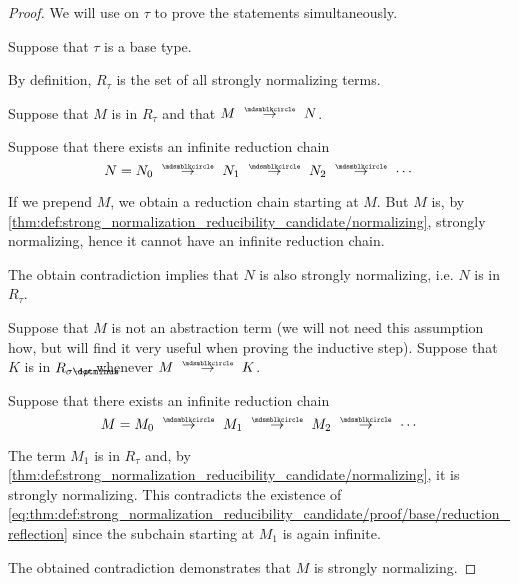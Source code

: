 \begin{proof}
  We will use  on \( \tau \) to prove the statements simultaneously.

   Suppose that \( \tau \) is a base type.

   By definition, \( R_\tau \) is the set of all strongly normalizing terms.

   Suppose that \( M \) is in \( R_\tau \) and that \( M \pred N \).

  Suppose that there exists an infinite reduction chain
  \begin{equation*}
    N = N_0 \pred N_1 \pred N_2 \pred \cdots
  \end{equation*}

  If we prepend \( M \), we obtain a reduction chain starting at \( M \). But \( M \) is, by \ref{thm:def:strong_normalization_reducibility_candidate/normalizing}, strongly normalizing, hence it cannot have an infinite reduction chain.

  The obtain contradiction implies that \( N \) is also strongly normalizing, i.e. \( N \) is in \( R_\tau \).

   Suppose that \( M \) is not an abstraction term (we will not need this assumption how, but will find it very useful when proving the inductive step). Suppose that \( K \) is in \( R_{\sigma \synimplies \rho} \) whenever \( M \pred K \).

  Suppose that there exists an infinite reduction chain
  \begin{equation}\label{eq:thm:def:strong_normalization_reducibility_candidate/proof/base/reduction_reflection}
    M = M_0 \pred M_1 \pred M_2 \pred \cdots
  \end{equation}

  The term \( M_1 \) is in \( R_\tau \) and, by \ref{thm:def:strong_normalization_reducibility_candidate/normalizing}, it is strongly normalizing. This contradicts the existence of \eqref{eq:thm:def:strong_normalization_reducibility_candidate/proof/base/reduction_reflection} since the subchain starting at \( M_1 \) is again infinite.

  The obtained contradiction demonstrates that \( M \) is strongly normalizing.


\end{proof}
